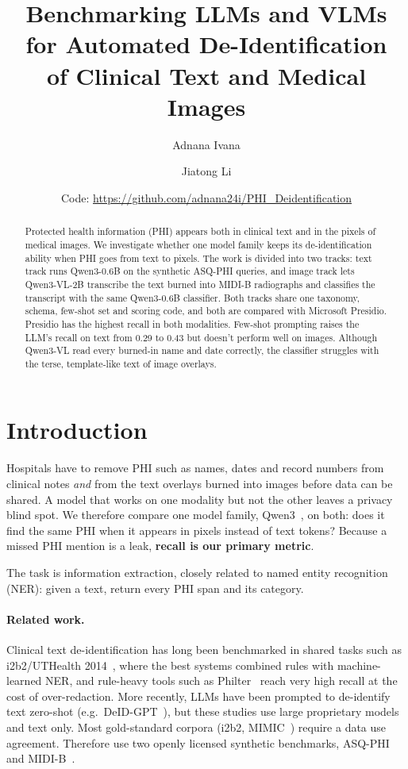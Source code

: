 \documentclass[11pt,a4paper]{article}
\title{Benchmarking LLMs and VLMs for Automated De-Identification\\
of Clinical Text and Medical Images}
\author{Adnana Ivana \and Jiatong Li}
\date{Code: \url{https://github.com/adnana24i/PHI_Deidentification}}
\begin{document}
\maketitle

\begin{abstract}
Protected health information (PHI) appears both in clinical text and in the pixels of medical images. We investigate whether one model family keeps its de-identification ability when PHI goes from text to pixels. The work is divided into two tracks: text track runs Qwen3-0.6B on the synthetic ASQ-PHI queries, and image track lets Qwen3-VL-2B transcribe the text burned into MIDI-B radiographs and classifies the transcript with the same Qwen3-0.6B classifier. Both tracks share one taxonomy, schema, few-shot set and scoring code, and both are compared with Microsoft Presidio. Presidio has the highest recall in both modalities. Few-shot prompting raises the LLM's recall on text from 0.29 to 0.43 but doesn't perform well on images. Although Qwen3-VL read every burned-in name and date correctly, the classifier struggles with the terse, template-like text of image overlays.
\end{abstract}

\section{Introduction}

Hospitals have to remove PHI such as names, dates and record numbers from clinical notes \emph{and} from the text overlays burned into images before data can be shared. A model that works on one modality but not the other leaves a privacy blind spot. We therefore compare one model family, Qwen3~\cite{qwen3}, on both: does it find the same PHI when it appears in pixels instead of text tokens? Because a missed PHI mention is a leak, \textbf{recall is our primary metric}.

The task is information extraction, closely related to named entity recognition (NER): given a text, return every PHI span and its category.

\paragraph{Related work.} Clinical text de-identification has long been benchmarked in shared tasks such as i2b2/UTHealth 2014~\cite{i2b2}, where the best systems combined rules with machine-learned NER, and rule-heavy tools such as Philter~\cite{philter} reach very high recall at the cost of over-redaction. More recently, LLMs have been prompted to de-identify text zero-shot (e.g.\ DeID-GPT~\cite{deidgpt}), but these studies use large proprietary models and text only. Most gold-standard corpora (i2b2, MIMIC~\cite{mimic}) require a data use agreement. Therefore use two openly licensed synthetic benchmarks, ASQ-PHI~\cite{asqphi} and MIDI-B~\cite{midib}.
\end{document}
